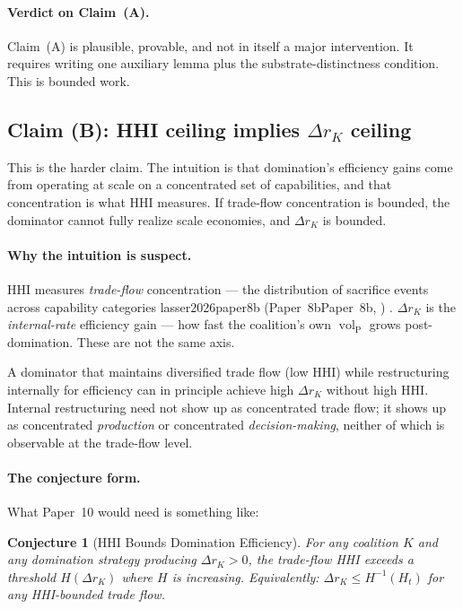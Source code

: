 \documentclass{article}
\makeatletter
\newcommand{\citep}[2][]{%
  \begingroup
  \def\@tmpkey{#2}%
  \ifx\@tmpkey\@empty\else
    (\ifx\@empty#1\@empty\else #1, \fi
     \@nameuse{bibkey@\@tmpkey})%
  \fi
  \endgroup
}
\newtheorem{conjecture}{Conjecture}
\DeclareMathOperator{\vol}{vol}
\newcommand{\volL}{{\vol_{\mathrm{P}}}}
\makeatother
\begin{document}
\paragraph{Verdict on Claim~(A).}
Claim~(A) is plausible, provable, and not in itself a major
intervention.  It requires writing one auxiliary lemma plus the
substrate-distinctness condition.  This is bounded work.

\subsection{Claim (B): HHI ceiling implies $\Delta r_K$ ceiling}

This is the harder claim.  The intuition is that domination's
efficiency gains come from operating at scale on a concentrated set of
capabilities, and that concentration is what HHI measures.  If
trade-flow concentration is bounded, the dominator cannot fully realize
scale economies, and $\Delta r_K$ is bounded.

\paragraph{Why the intuition is suspect.}
HHI measures \emph{trade-flow} concentration --- the distribution of
sacrifice events across capability categories
\citep[Paper~8b]{lasser2026paper8b}.  $\Delta r_K$ is the
\emph{internal-rate} efficiency gain --- how fast the coalition's own
$\volL$ grows post-domination.  These are not the same axis.

A dominator that maintains diversified trade flow (low HHI) while
restructuring internally for efficiency can in principle achieve high
$\Delta r_K$ without high HHI.  Internal restructuring need not show
up as concentrated trade flow; it shows up as concentrated
\emph{production} or concentrated \emph{decision-making}, neither of
which is observable at the trade-flow level.

\paragraph{The conjecture form.}
What Paper~10 would need is something like:

\begin{conjecture}[HHI Bounds Domination Efficiency]
\label{conj:hhi_bound}
For any coalition $K$ and any domination strategy producing
$\Delta r_K > 0$, the trade-flow HHI exceeds a threshold $H(\Delta
r_K)$ where $H$ is increasing.  Equivalently: $\Delta r_K \leq
H^{-1}(H_t)$ for any HHI-bounded trade flow.
\end{conjecture}
\end{document}

